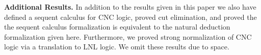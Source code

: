 \textbf{Additional Results.} In addition to the results given in this
paper we also have defined a sequent calculus for CNC logic, proved
cut elimination, and proved the the sequent calculus formalization is
equivalent to the natural deduction formalization given here.
Furthermore, we proved strong normalization of CNC logic via a
translation to LNL logic.  We omit these results due to space.

